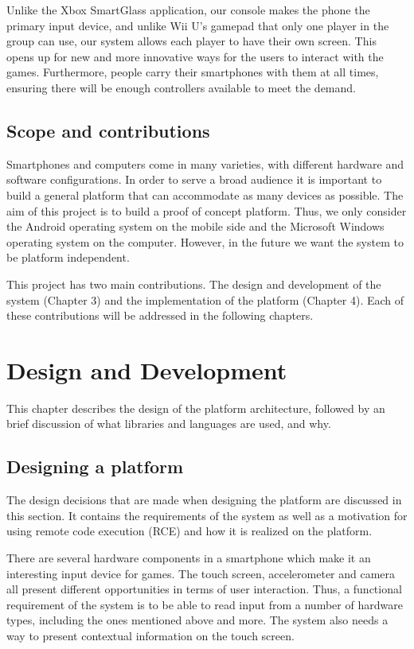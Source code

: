 \documentclass{article}
\begin{document}
Unlike the Xbox SmartGlass application, our console makes the phone the primary input device,
and unlike Wii U’s gamepad that only one player in the group can use, our system allows each
player to have their own screen. This opens up for new and more innovative ways for the users to
interact with the games. Furthermore, people carry their smartphones with them at all times,
ensuring there will be enough controllers available to meet the demand.


\subsection{Scope and contributions} 
Smartphones and computers come in many varieties, with different hardware and software
configurations. In order to serve a broad audience it is important to build a general platform that
can accommodate as many devices as possible. The aim of this project is to build a proof of
concept platform. Thus, we only consider the Android operating system on the mobile side and
the Microsoft Windows operating system on the computer. However, in the future we want the
system to be platform independent.

This project has two main contributions. The design and development of the system (Chapter
3) and the implementation of the platform (Chapter 4). Each of these contributions will be addressed in the following chapters.

\section{Design and Development} 
This chapter describes the design of the platform architecture, followed by an brief discussion
of what libraries and languages are used, and why.

\subsection{Designing a platform}
The design decisions that are made when designing the platform are discussed in this section. It
contains the requirements of the system as well as a motivation for using remote code execution
(RCE) and how it is realized on the platform.

There are several hardware components in a smartphone which make it an interesting input
device for games. The touch screen, accelerometer and camera all present different opportunities
in terms of user interaction. Thus, a functional requirement of the system is to be able to read
input from a number of hardware types, including the ones mentioned above and more. The
system also needs a way to present contextual information on the touch screen.
\end{document}
